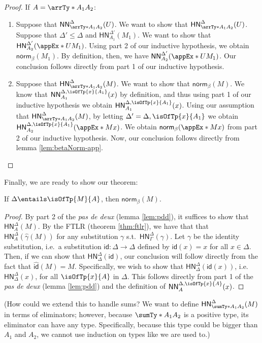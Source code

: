 \documentclass[letterpaper]{article}
\newcommand{\De}[0]{\Delta}
\newcommand{\Ga}[0]{\Gamma}
\newcommand{\ga}[0]{\gamma}
\newcommand{\betaNorm}[1]{\mathsf{norm}_\beta(#1)}
\newcommand{\HN}[3]{\mathsf{HN}^{#1}_{#2}(#3)}
\newcommand{\NN}[3]{\mathsf{NN}^{#1}_{#2}(#3)}
\begin{document}
\begin{proof}
If $A = \arrTy*{A_1}{A_2}$:
\begin{enumerate}
  \item Suppose that $\NN{\De}{\arrTy*{A_1}{A_2}}{U}$. We want to show that
    $\HN{\De}{\arrTy*{A_1}{A_2}}{U}$. Suppose that $\De' \leq \De$ and
    $\HN{\De'}{A_1}{M_1}$. We want to show that $\HN{\De'}{A_2}{\appEx*{U}{M_1}}$.
    Using part 2 of our inductive hypothesis, we obtain $\betaNorm{M_1}$.
    By definition, then, we have $\NN{\De'}{A_2}{\appEx*{U}{M_1}}$. Our conclusion
    follows directly from part 1 of our inductive hypothesis.

  \item Suppose that $\HN{\De}{\arrTy*{A_1}{A_2}}{M}$. We want to show that
    $\betaNorm{M}$. We know that $\NN{\De, \isOfTp{x}{A_1}}{A_1}{x}$ by
    definition, and thus using part 1 of our inductive hypothesis we
    obtain $\HN{\De, \isOfTp{x}{A_1}}{A_1}{x}$. Using our assumption that
    $\HN{\De}{\arrTy*{A_1}{A_2}}{M}$, by letting $\De' = \De, \isOfTp{x}{A_1}$
    we obtain $\HN{\De, \isOfTp{x}{A_1}}{A_2}{\appEx*{M}{x}}$. We obtain
    $\betaNorm{\appEx*{M}{x}}$ from part 2 of our inductive hypothesis.
    Now, our conclusion follows directly from lemma \ref{lem:betaNorm-app}.
\end{enumerate}
\end{proof}

Finally, we are ready to show our theorem:
\begin{theorem}
If $\De \entails \isOfTp{M}{A}$, then $\betaNorm{M}$.
\end{theorem}
\begin{proof}
By part 2 of the \textit{pas de deux} (lemma \ref{lem:pdd}), it suffices to
show that $\HN{\De}{A}{M}$. By the FTLR (theorem \ref{thm:ftlr}), we have that
that $\HN{\De}{A}{\widehat{\ga}(M)}$ for any substitution $\ga$ s.t.\
$\HN{\De}{\Ga}{\ga}$. Let $\ga$ be the identity substitution, i.e.\ a
substitution $\textsf{id} : \De \to \De$ defined by $\textsf{id}(x) = x$ for
all $x \in \De$. Then, if we can show that $\HN{\De}{\De}{\textsf{id}}$, our
conclusion will follow directly from the fact that $\widehat{\textsf{id}}(M) = M$.
Specifically, we wish to show that $\HN{\De}{\De}{\textsf{id}(x)}$, i.e.\
$\HN{\De}{\De}{x}$, for all $\isOfTp{x}{A}$ in $\De$. This follows directly from
part 1 of the \textit{pas de deux} (lemma \ref{lem:pdd}) and the definition of
$\NN{\De, \isOfTp{x}{A}}{A}{x}$.
\end{proof}

(How could we extend this to handle sums? We want to define
$\HN{\De}{\sumTy*{A_1}{A_2}}{M}$ in terms of eliminators; however, because
$\sumTy*{A_1}{A_2}$ is a positive type, its eliminator can have any type.
Specifically, because this type could be bigger than $A_1$ and $A_2$, we cannot
use induction on types like we are used to.)
\end{document}
